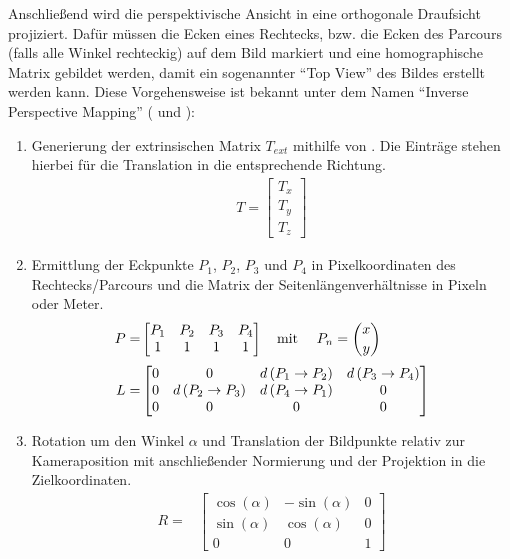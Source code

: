 Anschließend wird die perspektivische Ansicht in eine orthogonale Draufsicht projiziert. Dafür müssen die Ecken eines Rechtecks, bzw. die Ecken des Parcours (falls alle Winkel rechteckig) auf dem Bild markiert und eine homographische Matrix gebildet werden, damit ein sogenannter "`Top View"' des Bildes erstellt werden kann. Diese Vorgehensweise ist bekannt unter dem Namen "`Inverse Perspective Mapping"' (\cite{Galway} und \cite{Peter}): 
\begin{enumerate}
	\item Generierung der extrinsischen Matrix $T_{ext}$ mithilfe von \citep{Calib}. Die Einträge stehen hierbei für die Translation in die entsprechende Richtung.
	\begin{align*}
	T = \begin{bmatrix}
	T_x \\ 
	T_y \\ 
	T_z 
	\end{bmatrix}
	\end{align*}  
	\item Ermittlung der Eckpunkte $P_1$, $P_2$, $P_3$ und $P_4$ in Pixelkoordinaten des Rechtecks/Parcours und die Matrix der Seitenlängenverhältnisse in Pixeln oder Meter. 
	\begin{align*}
	P =& \begin{bmatrix}
	P_1 & P_2 & P_3 & P_4 \\
	1 & 1 & 1 & 1 	  
	\end{bmatrix} \text{\quad mit \quad} P_n = \binom{ x }{ y }\\[1mm]
	L =& \begin{bmatrix}
	0 & 0 & d\left(P_1 \rightarrow P_2 \right) & d\left(P_3 \rightarrow P_4 \right)\\
	0 & d\left(P_2 \rightarrow P_3 \right) & d\left(P_4 \rightarrow P_1 \right) & 0\\
	0 & 0 & 0 & 0 
	\end{bmatrix}	
	\end{align*}
	\item Rotation um den Winkel $\alpha$ und Translation der Bildpunkte relativ zur Kameraposition mit anschließender Normierung und der Projektion in die Zielkoordinaten. 
	\begin{align*}
	R =& \begin{bmatrix}
	\cos\left(\alpha \right) & -\sin\left(\alpha \right) & 0 \\
	\sin\left(\alpha \right) & \cos\left(\alpha \right) & 0 \\
	0 & 0 & 1 	  
	\end{bmatrix} \\[1mm]

\end{align*}
\end{enumerate}
